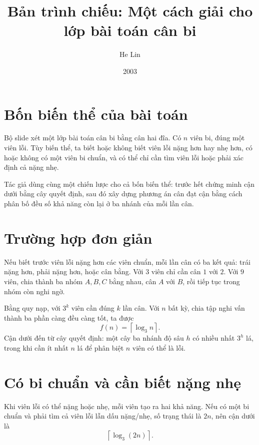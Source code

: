 \documentclass[11pt]{article}
\title{Bản trình chiếu: Một cách giải cho lớp bài toán cân bi}
\author{He Lin}
\date{2003}
\begin{document}
\maketitle


\section{Bốn biến thể của bài toán}

Bộ slide xét một lớp bài toán cân bi bằng cân hai đĩa. Có \(n\) viên bi,
đúng một viên lỗi. Tùy biến thể, ta biết hoặc không biết viên lỗi nặng hơn
hay nhẹ hơn, có hoặc không có một viên bi chuẩn, và có thể chỉ cần tìm viên
lỗi hoặc phải xác định cả nặng nhẹ.

Tác giả dùng cùng một chiến lược cho cả bốn biến thể: trước hết chứng minh
cận dưới bằng cây quyết định, sau đó xây dựng phương án cân đạt cận bằng cách
phân bố đều số khả năng còn lại ở ba nhánh của mỗi lần cân.

\section{Trường hợp đơn giản}

Nếu biết trước viên lỗi nặng hơn các viên chuẩn, mỗi lần cân có ba kết quả:
trái nặng hơn, phải nặng hơn, hoặc cân bằng. Với \(3\) viên chỉ cần cân
\(1\) với \(2\). Với \(9\) viên, chia thành ba nhóm \(A,B,C\) bằng nhau, cân
\(A\) với \(B\), rồi tiếp tục trong nhóm còn nghi ngờ.

Bằng quy nạp, với \(3^k\) viên cần đúng \(k\) lần cân. Với \(n\) bất kỳ, chia
tập nghi vấn thành ba phần càng đều càng tốt, ta được
\[
  f(n)=\left\lceil\log_3 n\right\rceil .
\]
Cận dưới đến từ cây quyết định: một cây ba nhánh độ sâu \(h\) có nhiều nhất
\(3^h\) lá, trong khi cần ít nhất \(n\) lá để phân biệt \(n\) viên có thể là
lỗi.

\section{Có bi chuẩn và cần biết nặng nhẹ}

Khi viên lỗi có thể nặng hoặc nhẹ, mỗi viên tạo ra hai khả năng. Nếu có một
bi chuẩn và phải tìm cả viên lỗi lẫn dấu nặng/nhẹ, số trạng thái là \(2n\),
nên cận dưới là
\[
  \left\lceil\log_3(2n)\right\rceil .
\]
\end{document}
